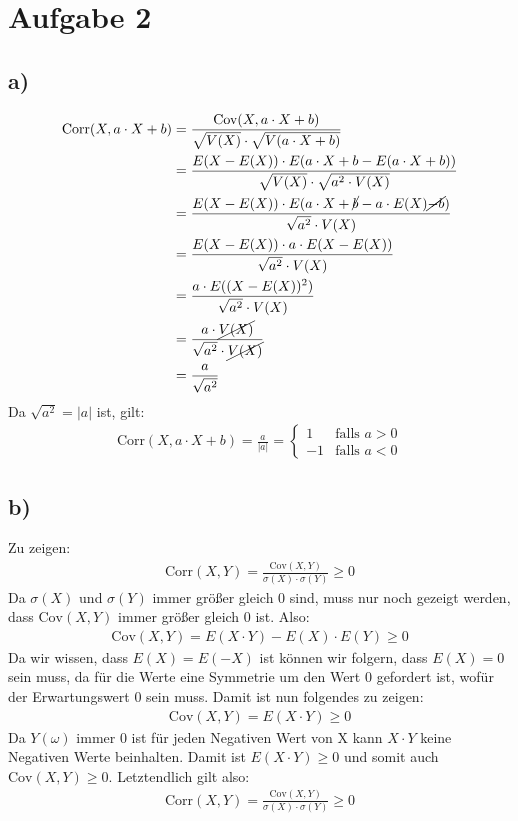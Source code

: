 \pagebreak
\section*{Aufgabe 2}
\subsection*{a)}
\begin{align*}
  \text{Corr}(X,a\cdot X+b) &= \frac{ \text{Cov}(X,a\cdot X+b) }{ \sqrt{V(X)}\cdot \sqrt{V(a\cdot X+b)} } \\
  &= \frac{ E(X - E(X))\cdot E(a\cdot X + b -E(a\cdot X+b)) }{ \sqrt{V(X)}\cdot \sqrt{a^2 \cdot V(X)} } \\
  &= \frac{ E(X - E(X))\cdot E(a\cdot X + \cancel{b} -a\cdot E(X)\cancel{-b}) }{ \sqrt{a^2} \cdot V(X) } \\
  &= \frac{ E(X - E(X))\cdot a\cdot E(X - E(X)) }{ \sqrt{a^2} \cdot V(X) } \\
  &= \frac{ a\cdot E((X - E(X))^2) }{ \sqrt{a^2} \cdot V(X) } \\
  &= \frac{ a\cdot \cancel{V(X)} }{ \sqrt{a^2} \cdot \cancel{V(X)} } \\
  &= \frac{ a }{ \sqrt{a^2} } \\
\end{align*}
Da $\sqrt{a^2} = |a|$ ist, gilt:
\begin{align*}
  \text{Corr}(X,a\cdot X+b) = \frac{ a }{ |a| } = \begin{cases}
    1 & \text{falls } a > 0 \\
    -1 & \text{falls } a < 0
  \end{cases}
\end{align*}
\subsection*{b)}
Zu zeigen:
\begin{align*}
\text{Corr}(X,Y) = \frac{ \text{Cov}(X,Y) }{ \sigma(X)\cdot \sigma(Y) } \ge 0
\end{align*}
Da $\sigma(X)$ und $\sigma(Y)$ immer größer gleich 0 sind, muss nur noch gezeigt werden, dass $\text{Cov}(X,Y)$ immer größer gleich 0 ist. Also: \\
\begin{align*}
  \text{Cov}(X,Y) = E(X\cdot Y) - E(X)\cdot E(Y) \ge 0
\end{align*}
Da wir wissen, dass $ E(X) = E(-X) $ ist können wir folgern, dass $ E(X) = 0 $ sein muss, da für die Werte eine Symmetrie um den Wert 0 gefordert ist, wofür der Erwartungswert 0 sein muss. Damit ist nun folgendes zu zeigen: \\
\begin{align*}
  \text{Cov}(X,Y) = E(X\cdot Y) \ge 0
\end{align*}
Da $ Y(\omega) $ immer 0 ist für jeden Negativen Wert von X kann $ X\cdot Y $ keine Negativen Werte beinhalten. Damit ist $ E(X\cdot Y) \ge 0 $ und somit auch $ \text{Cov}(X,Y) \ge 0 $.
Letztendlich gilt also:
\begin{align*}
  \text{Corr}(X,Y) = \frac{ \text{Cov}(X,Y) }{ \sigma(X)\cdot \sigma(Y) } \ge 0
\end{align*}
